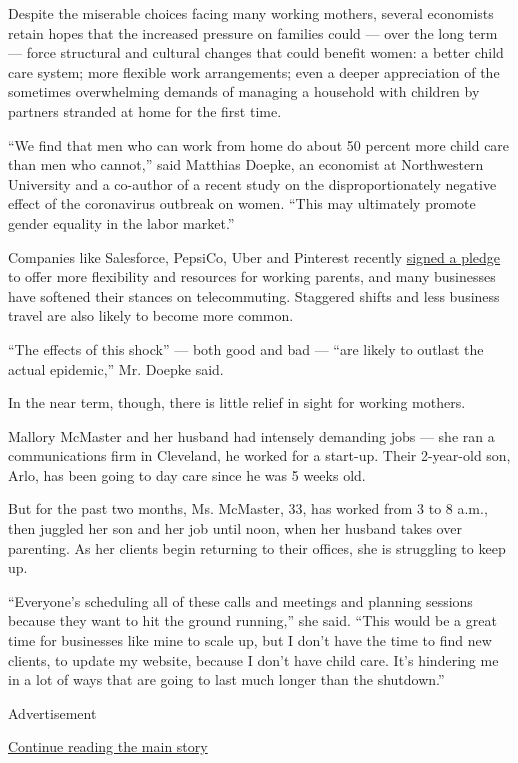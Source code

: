 Despite the miserable choices facing many working mothers, several
economists retain hopes that the increased pressure on families could
--- over the long term --- force structural and cultural changes that
could benefit women: a better child care system; more flexible work
arrangements; even a deeper appreciation of the sometimes overwhelming
demands of managing a household with children by partners stranded at
home for the first time.

``We find that men who can work from home do about 50 percent more child
care than men who cannot,'' said Matthias Doepke, an economist at
Northwestern University and a co-author of a recent study on the
disproportionately negative effect of the coronavirus outbreak on women.
``This may ultimately promote gender equality in the labor market.''

Companies like Salesforce, PepsiCo, Uber and Pinterest recently
\href{https://www.investinparents.com/}{signed a pledge} to offer more
flexibility and resources for working parents, and many businesses have
softened their stances on telecommuting. Staggered shifts and less
business travel are also likely to become more common.

``The effects of this shock'' --- both good and bad --- ``are likely to
outlast the actual epidemic,'' Mr. Doepke said.

In the near term, though, there is little relief in sight for working
mothers.

Mallory McMaster and her husband had intensely demanding jobs --- she
ran a communications firm in Cleveland, he worked for a start-up. Their
2-year-old son, Arlo, has been going to day care since he was 5 weeks
old.

But for the past two months, Ms. McMaster, 33, has worked from 3 to 8
a.m., then juggled her son and her job until noon, when her husband
takes over parenting. As her clients begin returning to their offices,
she is struggling to keep up.

``Everyone's scheduling all of these calls and meetings and planning
sessions because they want to hit the ground running,'' she said. ``This
would be a great time for businesses like mine to scale up, but I don't
have the time to find new clients, to update my website, because I don't
have child care. It's hindering me in a lot of ways that are going to
last much longer than the shutdown.''

Advertisement

\protect\hyperlink{after-bottom}{Continue reading the main story}

